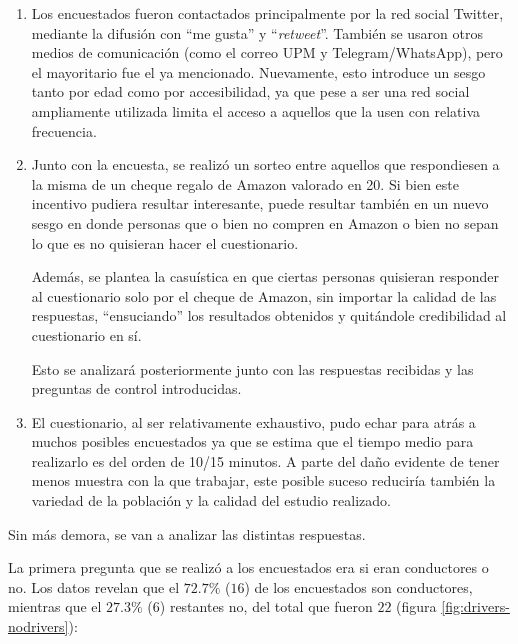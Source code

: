 \begin{enumerate}
  \item Los encuestados fueron contactados principalmente por la red social Twitter,
        mediante la difusión con ``me gusta'' y ``\textit{retweet}''. También se usaron otros
        medios de comunicación (como el correo UPM y Telegram/WhatsApp), pero el
        mayoritario fue el ya mencionado. Nuevamente, esto introduce un sesgo tanto
        por edad como por accesibilidad, ya que pese a ser una red social ampliamente
        utilizada limita el acceso a aquellos que la usen con relativa frecuencia.

  \item Junto con la encuesta, se realizó un sorteo entre aquellos que respondiesen
        a la misma de un cheque regalo de Amazon valorado en 20\EUR{}. Si bien este
        incentivo pudiera resultar interesante, puede resultar también en un nuevo
        sesgo en donde personas que o bien no compren en Amazon o bien no sepan
        lo que es no quisieran hacer el cuestionario.

        Además, se plantea la casuística en que ciertas personas quisieran responder
        al cuestionario solo por el cheque de Amazon, sin importar la calidad de
        las respuestas, ``ensuciando'' los resultados obtenidos y quitándole credibilidad
        al cuestionario en sí.

        Esto se analizará posteriormente junto con las respuestas recibidas y las
        preguntas de control introducidas.

  \item El cuestionario, al ser relativamente exhaustivo, pudo echar para atrás a muchos
        posibles encuestados ya que se estima que el tiempo medio para realizarlo es del
        orden de 10/15 minutos. A parte del daño evidente de tener menos muestra con la
        que trabajar, este posible suceso reduciría también la variedad de la población
        y la calidad del estudio realizado.
\end{enumerate}

Sin más demora, se van a analizar las distintas respuestas.

La primera pregunta que se realizó a los encuestados era si eran conductores o no.
Los datos revelan que el $72.7\%$ ($16$) de los encuestados son conductores, mientras que el
$27.3\%$ ($6$) restantes no, del total que fueron $22$ (figura \ref{fig:drivers-nodrivers}):

